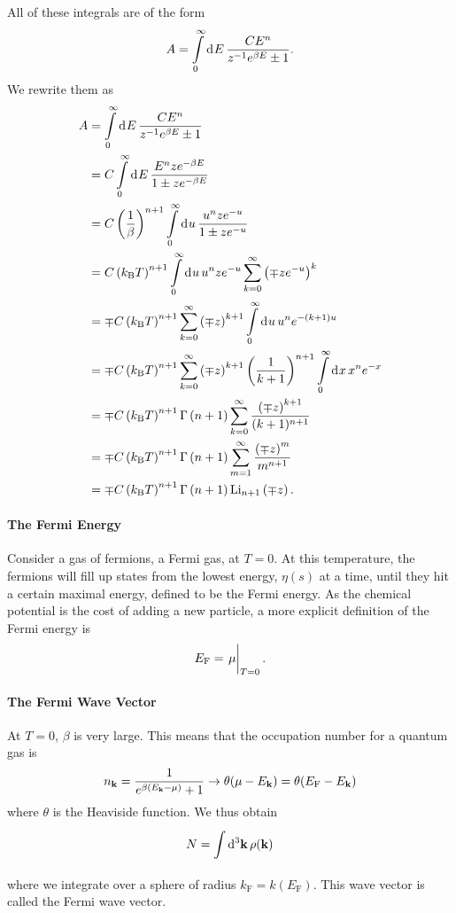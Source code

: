 All of these integrals are of the form
\begin{align*}
	A = \int\limits_{0}^{\infty}\dd[]{E}\frac{CE^{n}}{z^{-1}e^{\beta E} \pm 1}.
\end{align*}
We rewrite them as
\begin{align*}
	A &= \int\limits_{0}^{\infty}\dd[]{E}\frac{CE^{n}}{z^{-1}e^{\beta E} \pm 1} \\
	  &= C\int\limits_{0}^{\infty}\dd[]{E}\frac{E^{n}ze^{-\beta E}}{1 \pm ze^{-\beta E}} \\
	  &= C\left(\frac{1}{\beta}\right)^{n + 1}\int\limits_{0}^{\infty}\dd[]{u}\frac{u^{n}ze^{-u}}{1 \pm ze^{-u}} \\
	  &= C\left(k_{\text{B}} T\right)^{n + 1}\int\limits_{0}^{\infty}\dd[]{u}u^{n}ze^{-u}\sum\limits_{k = 0}^{\infty}\left(\mp ze^{-u}\right)^{k} \\
	  &= \mp C\left(k_{\text{B}} T\right)^{n + 1}\sum\limits_{k = 0}^{\infty}\left(\mp z\right)^{k + 1}\int\limits_{0}^{\infty}\dd[]{u}u^{n}e^{-(k + 1)u} \\
	  &= \mp C\left(k_{\text{B}} T\right)^{n + 1}\sum\limits_{k = 0}^{\infty}\left(\mp z\right)^{k + 1}\left(\frac{1}{k + 1}\right)^{n + 1}\int\limits_{0}^{\infty}\dd[]{x}x^{n}e^{-x} \\
	  &= \mp C\left(k_{\text{B}} T\right)^{n + 1}\Gamma\left(n + 1\right)\sum\limits_{k = 0}^{\infty}\frac{\left(\mp z\right)^{k + 1}}{(k + 1)^{n + 1}} \\
	  &= \mp C\left(k_{\text{B}} T\right)^{n + 1}\Gamma\left(n + 1\right)\sum\limits_{m = 1}^{\infty}\frac{\left(\mp z\right)^{m}}{m^{n + 1}} \\
	  &= \mp C\left(k_{\text{B}} T\right)^{n + 1}\Gamma\left(n + 1\right)\text{Li}_{n + 1}\left(\mp z\right).
\end{align*}

\paragraph{The Fermi Energy}
Consider a gas of fermions, a Fermi gas, at $T = 0$. At this temperature, the fermions will fill up states from the lowest energy, $\eta(s)$ at a time, until they hit a certain maximal energy, defined to be the Fermi energy. As the chemical potential is the cost of adding a new particle, a more explicit definition of the Fermi energy is
\begin{align*}
	E_{\text{F}} = \eval{\mu}_{T = 0}.
\end{align*}

\paragraph{The Fermi Wave Vector}
At $T = 0$, $\beta$ is very large. This means that the occupation number for a quantum gas is
\begin{align*}
	n_{\vb{k}} = \frac{1}{e^{\beta(E_{\vb{k}} - \mu)} + 1} \to \theta(\mu - E_{\vb{k}}) = \theta(E_{\text{F}} - E_{\vb{k}})
\end{align*}
where $\theta$ is the Heaviside function. We thus obtain
\begin{align*}
	N = \int\limits_{}^{}\dd[3]{\vb{k}}\rho(\vb{k})
\end{align*}
where we integrate over a sphere of radius $k_{\text{F}} = k(E_{\text{F}})$. This wave vector is called the Fermi wave vector.

